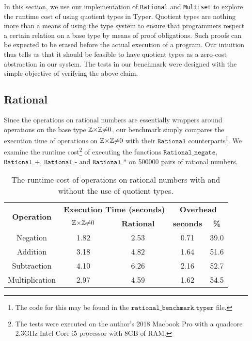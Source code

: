 \documentclass[12pt,twoside,maitrise]{dms}
\theoremstyle{definition}
\numberwithin{equation}{section}
\numberwithin{table}{chapter}
\numberwithin{figure}{chapter}
\newcommand\id[1] {\texttt{#1}}
\newcommand\fn[1] {\texttt{#1}}
\begin{document}
In this section, we use our implementation of \id{Rational} and \id{Multiset} to
explore the runtime cost of using quotient types in Typer. Quotient types are
nothing more than a means of using the type system to ensure that programmers
respect a certain relation on a base type by means of proof obligations. Such
proofs can be expected to be erased before the actual execution of a program.
Our intuition thus tells us that it should be feasible to have quotient types as
a zero-cost abstraction in our system. The tests in our benchmark were designed
with the simple objective of verifying the above claim.

\subsection*{Rational}

Since the operations on rational numbers are essentially wrappers around
operations on the base type $\mathbb{Z}{\times}\mathbb{Z}{\ne}0$, our benchmark simply compares the
execution time of operations on $\mathbb{Z}{\times}\mathbb{Z}{\ne}0$ with their $\fn{Rational}$
counterparts\footnote{The code for this may be found in the
$\fn{rational\_benchmark.typer}$ file.}. We examine the runtime
cost\footnote{The tests were executed on the author's 2018 Macbook Pro with a
quadcore 2.3GHz Intel Core i5 processor with 8GB of RAM.} of executing the
functions $\fn{Rational\_negate}$, $\fn{Rational\_+}$, $\fn{Rational\_-}$ and
$\fn{Rational\_*}$ on 500000 pairs of rational numbers.

\begin{table}[H]
\centering
\begin{tabular}{ccccc}
\hline
\multirow{2}{*}{\textbf{Operation}} & \multicolumn{2}{c}{\textbf{Execution Time (seconds)}} & \multicolumn{2}{c}{\textbf{Overhead}} \\ \cline{2-5}
                                    & \textbf{$\mathbb{Z}{\times}\mathbb{Z}{\ne}0$}          & \textbf{Rational}         & \textbf{seconds}     & \textbf{\%}    \\ \hline
Negation       & 1.82 & 2.53 & 0.71 & 39.0 \\
Addition       & 3.18 & 4.82 & 1.64 & 51.6 \\
Subtraction    & 4.10 & 6.26 & 2.16 & 52.7 \\
Multiplication & 2.97 & 4.59 & 1.62 & 54.5 \\ \hline
\end{tabular}
\caption{The runtime cost of operations on rational numbers with and without the
  use of quotient types.}\label{tab:rational-benchmark}
\end{table}
\end{document}
